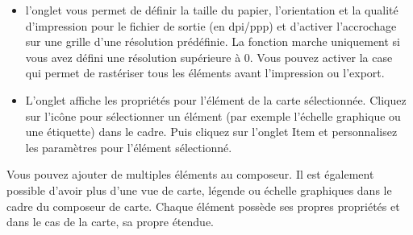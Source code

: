 \begin{itemize}[label=--]
\item l'onglet  vous permet de définir la taille du papier, l'orientation et la qualité d'impression pour le fichier de sortie (en dpi/ppp) et d'activer l'accrochage sur une grille d'une résolution prédéfinie. La fonction  marche uniquement si vous avez défini une résolution supérieure à 0. Vous pouvez activer la case\\  qui permet de rastériser tous les éléments avant l'impression ou l'export.
\item L'onglet  affiche les propriétés pour l'élément de la carte sélectionnée. Cliquez sur l'icône   pour sélectionner un élément (par exemple l'échelle graphique ou une étiquette) dans le cadre. Puis cliquez sur l'onglet Item et personnalisez les paramètres pour l'élément sélectionné.
\end{itemize}

Vous pouvez ajouter de multiples éléments au composeur. Il est également possible d'avoir plus d'une vue de carte, légende ou échelle graphiques dans le
cadre du composeur de carte. Chaque élément possède ses propres propriétés et dans le cas de la carte, sa propre étendue.

